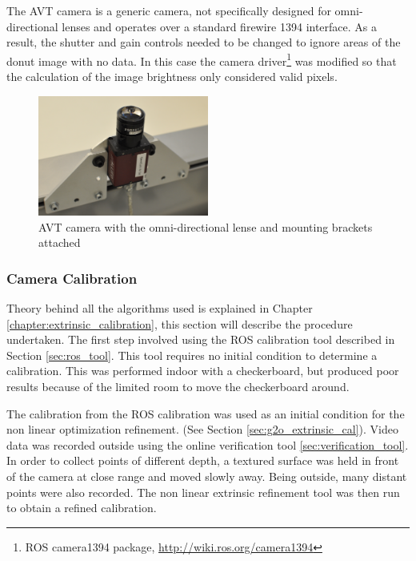 The AVT camera is a generic camera, not specifically designed for omni-directional lenses and operates over a standard firewire 1394 interface.  As a result, the shutter and gain controls needed to be changed to ignore areas of the donut image with no data.  In this case the camera driver\footnote{ROS camera1394 package, \url{http://wiki.ros.org/camera1394}} was modified so that the calculation of the image brightness only considered valid pixels.


\begin{figure}[h]
  \centering
    \includegraphics[width=0.5\textwidth]{chapters/images/omni_cam_image}
  \caption{AVT camera with the omni-directional lense and mounting brackets attached}
\end{figure}

\subsubsection{Camera Calibration}

Theory behind all the algorithms used is explained in Chapter \ref{chapter:extrinsic_calibration}, this section will describe the procedure undertaken.  The first step involved using the ROS calibration tool described in Section \ref{sec:ros_tool}.  This tool requires no initial condition to determine a calibration.  This was performed indoor with a checkerboard, but produced poor results because of the limited room to move the checkerboard around.

The calibration from the ROS calibration was used as an initial condition for the non linear optimization refinement. (See Section \ref{sec:g2o_extrinsic_cal}).  Video data was recorded outside using the online verification tool \ref{sec:verification_tool}.  In order to collect points of different depth, a textured surface was held in front of the camera at close range and moved slowly away.  Being outside, many distant points were also recorded.  The non linear extrinsic refinement tool was then run to obtain a refined calibration.   

